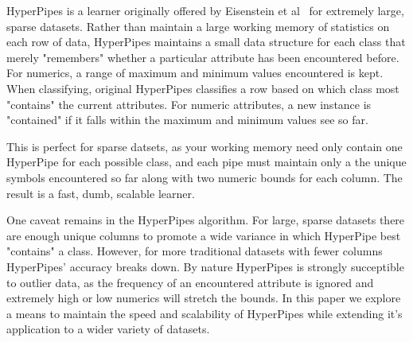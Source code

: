 HyperPipes is a learner originally offered by Eisenstein et al~\cite{Eisenstein04} for extremely large, sparse datasets. Rather than maintain a large working memory of statistics on each row of data, HyperPipes maintains a small data structure for each class that merely "remembers" whether a particular attribute has been encountered before. For numerics, a range of maximum and minimum values encountered is kept. When classifying, original HyperPipes classifies a row based on which class most "contains" the current attributes. For numeric attributes, a new instance is "contained" if it falls within the maximum and minimum values see so far.

This is perfect for sparse datsets, as your working memory need only contain one HyperPipe for each possible class, and each pipe must maintain only a the unique symbols encountered so far along with two numeric bounds for each column. The result is a fast, dumb, scalable learner.

One caveat remains in the HyperPipes algorithm. For large, sparse datasets there are enough unique columns to promote a wide variance in which HyperPipe best "contains" a class. However, for more traditional datasets with fewer columns HyperPipes' accuracy breaks down. By nature HyperPipes is strongly succeptible to outlier data, as the frequency of an encountered attribute is ignored and extremely high or low numerics will stretch the bounds. In this paper we explore a means to maintain the speed and scalability of HyperPipes while extending it's application to a wider variety of datasets.
